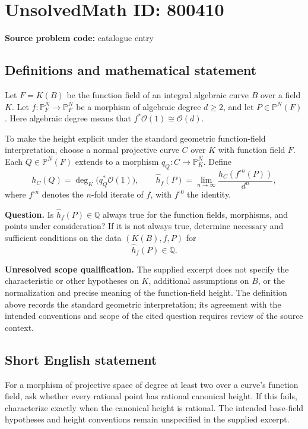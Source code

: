 \documentclass[11pt]{article}
\newcommand{\Q}{\mathbb{Q}}
\newcommand{\PP}{\mathbb{P}}
\begin{document}
\section*{UnsolvedMath ID: 800410}
\textbf{Source problem code:} catalogue entry
\subsection{Definitions and mathematical statement}
Let \(F=K(B)\) be the function field of an integral algebraic curve \(B\) over a field \(K\). Let \(f:\PP^N_F\to\PP^N_F\) be a morphism of algebraic degree \(d\geq 2\), and let \(P\in\PP^N(F)\). Here algebraic degree means that \(f^*\mathcal O(1)\cong\mathcal O(d)\).

To make the height explicit under the standard geometric function-field interpretation, choose a normal projective curve \(C\) over \(K\) with function field \(F\). Each \(Q\in\PP^N(F)\) extends to a morphism \(q_Q:C\to\PP^N_K\). Define
\[
 h_C(Q)=\deg_K\bigl(q_Q^*\mathcal O(1)\bigr),
 \qquad
 \hat h_f(P)=\lim_{n\to\infty}\frac{h_C(f^{\circ n}(P))}{d^n},
\]
where \(f^{\circ n}\) denotes the \(n\)-fold iterate of \(f\), with \(f^{\circ 0}\) the identity.

\textbf{Question.} Is \(\hat h_f(P)\in\Q\) always true for the function fields, morphisms, and points under consideration? If it is not always true, determine necessary and sufficient conditions on the data \((K(B),f,P)\) for
\[
\hat h_f(P)\in\Q.
\]

\textbf{Unresolved scope qualification.} The supplied excerpt does not specify the characteristic or other hypotheses on \(K\), additional assumptions on \(B\), or the normalization and precise meaning of the function-field height. The definition above records the standard geometric interpretation; its agreement with the intended conventions and scope of the cited question requires review of the source context.
\subsection{Short English statement}
For a morphism of projective space of degree at least two over a curve's function field, ask whether every rational point has rational canonical height. If this fails, characterize exactly when the canonical height is rational. The intended base-field hypotheses and height conventions remain unspecified in the supplied excerpt.
\end{document}

